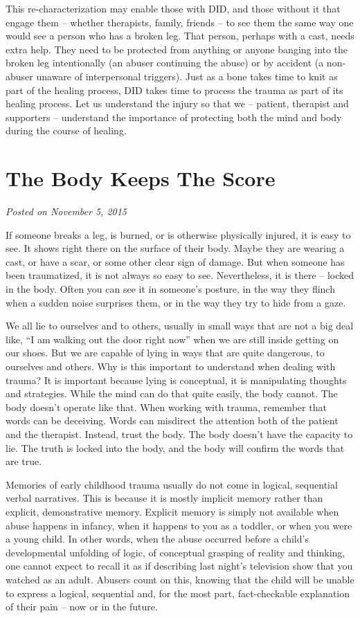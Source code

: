 \documentclass[]{book}
\begin{document}
This re-characterization may enable those with DID, and those without it that engage them -- whether therapists, family, friends -- to see them the same way one would see a person who has a broken leg. That person, perhaps with a cast, needs extra help. They need to be protected from anything or anyone banging into the broken leg intentionally (an abuser continuing the abuse) or by accident (a non-abuser unaware of interpersonal triggers). Just as a bone takes time to knit as part of the healing process, DID takes time to process the trauma as part of its healing process. Let us understand the injury so that we -- patient, therapist and supporters -- understand the importance of protecting both the mind and body during the course of healing.

\hypertarget{the-body-keeps-the-score}{%
\section{The Body Keeps The Score}\label{the-body-keeps-the-score}}

\emph{Posted on November 5, 2015}

If someone breaks a leg, is burned, or is otherwise physically injured, it is easy to see. It shows right there on the surface of their body. Maybe they are wearing a cast, or have a scar, or some other clear sign of damage. But when someone has been traumatized, it is not always so easy to see. Nevertheless, it is there -- locked in the body. Often you can see it in someone's posture, in the way they flinch when a sudden noise surprises them, or in the way they try to hide from a gaze.

We all lie to ourselves and to others, usually in small ways that are not a big deal like, ``I am walking out the door right now'' when we are still inside getting on our shoes. But we are capable of lying in ways that are quite dangerous, to ourselves and others. Why is this important to understand when dealing with trauma? It is important because lying is conceptual, it is manipulating thoughts and strategies. While the mind can do that quite easily, the body cannot. The body doesn't operate like that. When working with trauma, remember that words can be deceiving. Words can misdirect the attention both of the patient and the therapist. Instead, trust the body. The body doesn't have the capacity to lie. The truth is locked into the body, and the body will confirm the words that are true.

Memories of early childhood trauma usually do not come in logical, sequential verbal narratives. This is because it is mostly implicit memory rather than explicit, demonstrative memory. Explicit memory is simply not available when abuse happens in infancy, when it happens to you as a toddler, or when you were a young child. In other words, when the abuse occurred before a child's developmental unfolding of logic, of conceptual grasping of reality and thinking, one cannot expect to recall it as if describing last night's television show that you watched as an adult. Abusers count on this, knowing that the child will be unable to express a logical, sequential and, for the most part, fact-checkable explanation of their pain -- now or in the future.
\end{document}
